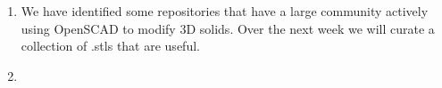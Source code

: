 \documentclass[sigconf,authorversion,nonacm]{acmart}
\begin{document}
\begin{enumerate}
	\item We have identified some repositories that have a large community actively using OpenSCAD to modify 3D solids. Over the next week we will curate a collection of .stls that are useful.
	\item
\end{enumerate}


\end{document}
